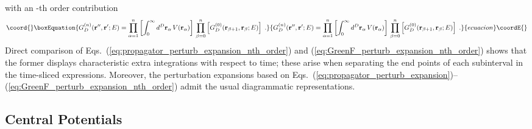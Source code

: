 \documentclass[a4paper,preprint,draft,showpacs,amsmath,amsfonts,amssymb,aps,prd]{revtex4}%
\begin{document}
with an \coordHE{}-th order contribution
\begin{equation}\coord{}\boxEquation{
G^{(n)}_{D}({\bf r}'', {\bf r}' ; E) 
=
\prod_{\alpha=1}^{n} 
\left[ 
\int_{0}^{\infty}
d^{D} {\bf r}_{\alpha} \,
 V({\bf r}_{\alpha})  
\right]
\,
\prod_{\beta=0}^{n} \left[ 
G^{(0)}_{D}({\bf r}_{\beta + 1}, {\bf r}_{\beta} ; E )  \right]
\;  .
\label{eq:GreenF_perturb_expansion_nth_order}
}{
G^{(n)}_{D}({\bf r}'', {\bf r}' ; E) 
=
\prod_{\alpha=1}^{n} 
\left[ 
\int_{0}^{\infty}
d^{D} {\bf r}_{\alpha} \,
 V({\bf r}_{\alpha})  
\right]
\,
\prod_{\beta=0}^{n} \left[ 
G^{(0)}_{D}({\bf r}_{\beta + 1}, {\bf r}_{\beta} ; E )  \right]
\;  .
}{ecuacion}\coordE{}\end{equation}
Direct comparison of 
Eqs.~(\ref{eq:propagator_perturb_expansion_nth_order}) 
and (\ref{eq:GreenF_perturb_expansion_nth_order})
shows that the former displays characteristic extra integrations with respect to time;
these arise when separating the end points of each subinterval
in the time-sliced expressions.
Moreover, the perturbation
expansions based on 
Eqs.~(\ref{eq:propagator_perturb_expansion})--(\ref{eq:GreenF_perturb_expansion_nth_order})
admit the usual diagrammatic representations.


\subsection{Central Potentials}
\label{sec:central_potentials}
\end{document}
